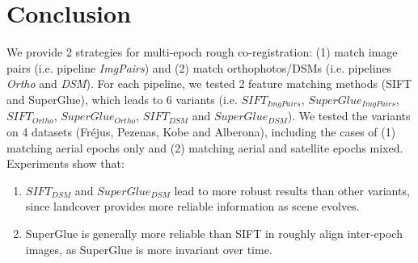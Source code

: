 \section{Conclusion}
We provide 2 strategies for multi-epoch rough co-registration: (1) match image pairs (i.e. pipeline \textit{ImgPairs}) and (2) match orthophotos/DSMs (i.e. pipelines \textit{Ortho} and \textit{DSM}).
For each pipeline, we tested 2 feature matching methods (SIFT and SuperGlue), which leads to 6 variants (i.e.  $SIFT_{ImgPairs}$,  $SuperGlue_{ImgPairs}$,  $SIFT_{Ortho}$,  $SuperGlue_{Ortho}$,  $SIFT_{DSM}$ and  $SuperGlue_{DSM}$).
We tested the variants on 4 datasets (Fr{\'e}jus, Pezenas, Kobe and Alberona), including the cases of (1) matching aerial epochs only and (2) matching aerial and satellite epochs mixed.
Experiments show that:\\
\begin{enumerate}
	\item $SIFT_{DSM}$ and $SuperGlue_{DSM}$ lead to more robust results than other variants, since landcover provides more reliable information as scene evolves.
	\item SuperGlue is generally more reliable than SIFT in roughly align inter-epoch images, as SuperGlue is more invariant over time.
\end{enumerate}


